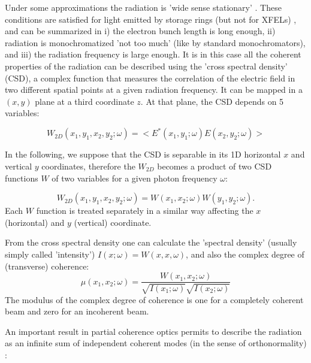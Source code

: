 \documentclass{iucr}              %
\begin{document}
Under some approximations the radiation is 'wide sense stationary' \cite{mandel_wolf}. These conditions are satisfied for light emitted by storage rings (but not for XFELs) \cite{geloni2008}, and can be summarized in
i) the electron bunch length is long enough,
ii) radiation is monochromatized 'not too much' (like by standard monochromators), and 
iii) the radiation frequency is large enough.
It is in this case all the coherent properties of the radiation can be described using the 'cross spectral density' (CSD), a complex function that measures the correlation of the electric field in two different spatial points at a given radiation frequency. It can be mapped in a $(x,y)$ plane at a third coordinate $z$. At that plane, the CSD depends on 5 variables: 

\begin{equation}
W_{2D}(x_1,y_1,x_2,y_2;\omega) = <E^*(x_1,y_1;\omega) E(x_2,y_2;\omega)>
\label{eq:CSD_1D}
\end{equation}

In the following, we suppose that the CSD is separable in its 1D horizontal $x$ and vertical $y$ coordinates, therefore the $W_{2D}$ becomes a product of two CSD functions $W$ of two variables for a given photon frequency $\omega$:

\begin{equation}
W_{2D}(x_1,y_1,x_2,y_2;\omega) = W(x_1,x_2;\omega) W(y_1,y_2;\omega).
\label{eq:CSD_2D}
\end{equation}
Each $W$ function is treated separately in a similar way affecting the $x$ (horizontal) and $y$ (vertical) coordinate.

From the cross spectral density one can calculate the 'spectral density' (usually simply called 'intensity') $I(x;\omega)=W(x,x,\omega)$, and also the complex degree of (transverse) coherence: 
\begin{equation}
\mu(x_1,x_2;\omega) = \frac{W(x_1,x_2;\omega)}{\sqrt{I(x_1;\omega)}\sqrt{I(x_2;\omega)}}
\label{eq:DTC}
\end{equation}
The modulus of the complex degree of coherence is one for a completely coherent beam and zero for an incoherent beam. 

An important result in partial coherence optics permits to describe the radiation as an infinite sum of independent coherent modes (in the sense of orthonormality) :
\end{document}
